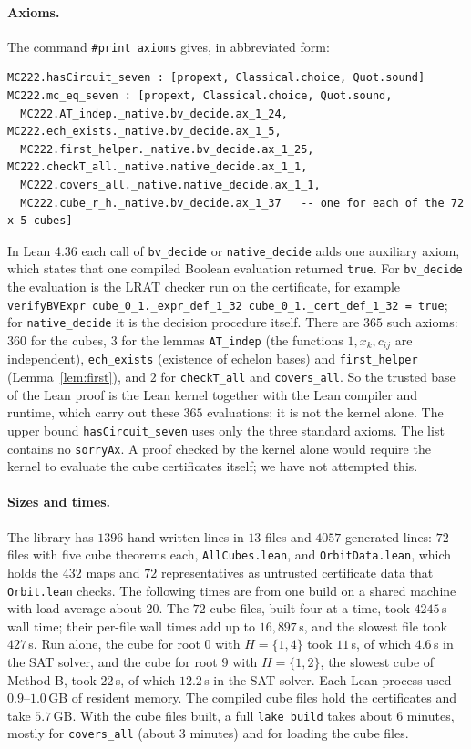 \documentclass[11pt,a4paper]{article}
\theoremstyle{definition}
\newcommand{\code}[1]{\texttt{#1}}
\begin{document}
\paragraph{Axioms.} The command \code{\#print axioms} gives, in abbreviated form:
\begin{Verbatim}[fontsize=\footnotesize,frame=single,framesep=2mm]
MC222.hasCircuit_seven : [propext, Classical.choice, Quot.sound]
MC222.mc_eq_seven : [propext, Classical.choice, Quot.sound,
  MC222.AT_indep._native.bv_decide.ax_1_24, MC222.ech_exists._native.bv_decide.ax_1_5,
  MC222.first_helper._native.bv_decide.ax_1_25, MC222.checkT_all._native.native_decide.ax_1_1,
  MC222.covers_all._native.native_decide.ax_1_1,
  MC222.cube_r_h._native.bv_decide.ax_1_37   -- one for each of the 72 x 5 cubes]
\end{Verbatim}
In Lean 4.36 each call of \code{bv\_decide} or \code{native\_decide} adds one auxiliary axiom, which states that one compiled Boolean evaluation returned \code{true}. For \code{bv\_decide} the evaluation is the LRAT checker run on the certificate, for example \code{verifyBVExpr cube\_0\_1.\_expr\_def\_1\_32 cube\_0\_1.\_cert\_def\_1\_32 = true}; for \code{native\_decide} it is the decision procedure itself. There are $365$ such axioms: $360$ for the cubes, $3$ for the lemmas \code{AT\_indep} (the functions $1,x_k,c_{ij}$ are independent), \code{ech\_exists} (existence of echelon bases) and \code{first\_helper} (Lemma~\ref{lem:first}), and $2$ for \code{checkT\_all} and \code{covers\_all}. So the trusted base of the Lean proof is the Lean kernel together with the Lean compiler and runtime, which carry out these $365$ evaluations; it is not the kernel alone. The upper bound \code{hasCircuit\_seven} uses only the three standard axioms. The list contains no \code{sorryAx}. A proof checked by the kernel alone would require the kernel to evaluate the cube certificates itself; we have not attempted this.

\paragraph{Sizes and times.} The library has $1396$ hand-written lines in $13$ files and $4057$ generated lines: $72$ files with five cube theorems each, \code{AllCubes.lean}, and \code{OrbitData.lean}, which holds the $432$ maps and $72$ representatives as untrusted certificate data that \code{Orbit.lean} checks. The following times are from one build on a shared machine with load average about $20$. The $72$ cube files, built four at a time, took $4245$\,s wall time; their per-file wall times add up to $16{,}897$\,s, and the slowest file took $427$\,s. Run alone, the cube for root $0$ with $H=\{1,4\}$ took $11$\,s, of which $4.6$\,s in the SAT solver, and the cube for root $9$ with $H=\{1,2\}$, the slowest cube of Method B, took $22$\,s, of which $12.2$\,s in the SAT solver. Each Lean process used $0.9$--$1.0$\,GB of resident memory. The compiled cube files hold the certificates and take $5.7$\,GB. With the cube files built, a full \code{lake build} takes about $6$ minutes, mostly for \code{covers\_all} (about $3$ minutes) and for loading the cube files.
\end{document}
